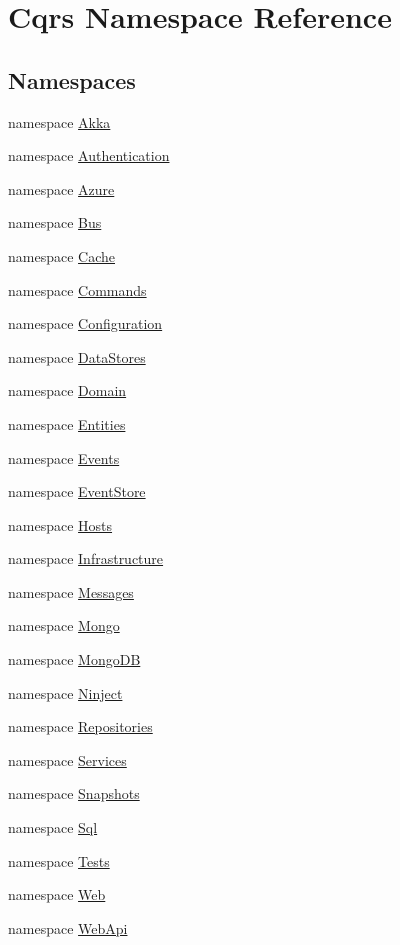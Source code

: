 \hypertarget{namespaceCqrs}{}\section{Cqrs Namespace Reference}
\label{namespaceCqrs}
\subsection*{Namespaces}
\begin{DoxyCompactItemize}
\item 
namespace \hyperlink{namespaceCqrs_1_1Akka}{Akka}
\item 
namespace \hyperlink{namespaceCqrs_1_1Authentication}{Authentication}
\item 
namespace \hyperlink{namespaceCqrs_1_1Azure}{Azure}
\item 
namespace \hyperlink{namespaceCqrs_1_1Bus}{Bus}
\item 
namespace \hyperlink{namespaceCqrs_1_1Cache}{Cache}
\item 
namespace \hyperlink{namespaceCqrs_1_1Commands}{Commands}
\item 
namespace \hyperlink{namespaceCqrs_1_1Configuration}{Configuration}
\item 
namespace \hyperlink{namespaceCqrs_1_1DataStores}{Data\+Stores}
\item 
namespace \hyperlink{namespaceCqrs_1_1Domain}{Domain}
\item 
namespace \hyperlink{namespaceCqrs_1_1Entities}{Entities}
\item 
namespace \hyperlink{namespaceCqrs_1_1Events}{Events}
\item 
namespace \hyperlink{namespaceCqrs_1_1EventStore}{Event\+Store}
\item 
namespace \hyperlink{namespaceCqrs_1_1Hosts}{Hosts}
\item 
namespace \hyperlink{namespaceCqrs_1_1Infrastructure}{Infrastructure}
\item 
namespace \hyperlink{namespaceCqrs_1_1Messages}{Messages}
\item 
namespace \hyperlink{namespaceCqrs_1_1Mongo}{Mongo}
\item 
namespace \hyperlink{namespaceCqrs_1_1MongoDB}{Mongo\+DB}
\item 
namespace \hyperlink{namespaceCqrs_1_1Ninject}{Ninject}
\item 
namespace \hyperlink{namespaceCqrs_1_1Repositories}{Repositories}
\item 
namespace \hyperlink{namespaceCqrs_1_1Services}{Services}
\item 
namespace \hyperlink{namespaceCqrs_1_1Snapshots}{Snapshots}
\item 
namespace \hyperlink{namespaceCqrs_1_1Sql}{Sql}
\item 
namespace \hyperlink{namespaceCqrs_1_1Tests}{Tests}
\item 
namespace \hyperlink{namespaceCqrs_1_1Web}{Web}
\item 
namespace \hyperlink{namespaceCqrs_1_1WebApi}{Web\+Api}
\end{DoxyCompactItemize}
